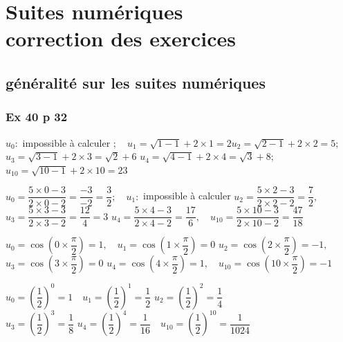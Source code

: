 \documentclass[a4paper,french]{book}
\begin{document}
\graphicspath{{images/}}
\setcounter{chapter}{5}
\chapter[Correction des exercices]{Suites numériques \\ correction des exercices}
\thispagestyle{fancy}

\section*{généralité sur les suites numériques}

\subsection*{Ex 40 p 32}

\begin{enumMet}
\item $u_{0}:$ impossible à calculer $;\quad u_{1}=\sqrt{1-1}+2 \times 1=2$\quad $u_{2}=\sqrt{2-1}+2 \times 2=5 ;$\\
$u_{3}=\sqrt{3-1}+2 \times 3=\sqrt{2}+6$\quad
$u_{4}=\sqrt{4-1}+2 \times 4=\sqrt{3}+8 ;\quad$\\ $u_{10}=\sqrt{10-1}+2 \times 10=23$
    \item $u_{0}=\dfrac{5 \times 0-3}{2 \times 0-2}=\dfrac{-3}{-2}=\dfrac{3}{2} ;\quad u_{1}:$ impossible à calculer\quad
$u_{2}=\dfrac{5 \times 2-3}{2 \times 2-2}=\dfrac{7}{2},$\\ $u_{3}=\dfrac{5 \times 3-3}{2 \times 3-2}=\dfrac{12}{4}=3$\quad
$u_{4}=\dfrac{5 \times 4-3}{2 \times 4-2}=\dfrac{17}{6},\quad u_{10}=\dfrac{5 \times 10-3}{2 \times 10-2}=\dfrac{47}{18}$
    \item $u_{0}=\cos \left(0 \times \dfrac{\pi}{2}\right)=1,\quad u_{1}=\cos \left(1 \times \dfrac{\pi}{2}\right)=0$\quad
$u_{2}=\cos \left(2 \times \dfrac{\pi}{2}\right)=-1,$\\
$u_{3}=\cos \left(3 \times \dfrac{\pi}{2}\right)=0$ \quad
$u_{4}=\cos \left(4 \times \dfrac{\pi}{2}\right)=1, \quad u_{10}=\cos \left(10 \times \dfrac{\pi}{2}\right)=-1$
    \item $u_{0}=\left(\dfrac{1}{2}\right)^{0}=1 \quad u_{1}=\left(\dfrac{1}{2}\right)^{1}=\dfrac{1}{2}$\quad
$u_{2}=\left(\dfrac{1}{2}\right)^{2}=\dfrac{1}{4}$\\ $u_{3}=\left(\dfrac{1}{2}\right)^{3}=\dfrac{1}{8}$\quad
$u_{4}=\left(\dfrac{1}{2}\right)^{4}=\dfrac{1}{16}\quad u_{10}=\left(\dfrac{1}{2}\right)^{10}=\dfrac{1}{1024}$
\end{enumMet}
\end{document}

